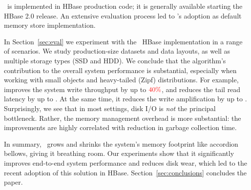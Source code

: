 \sys\ is implemented in HBase production code; it is generally available starting the HBase 2.0 release. 
An extensive evaluation process led to \sys's adoption as default memory store implementation. 

In Section~\ref{sec:eval} we experiment with the \sys\ HBase implementation in a range of scenarios.
We study production-size datasets and data layouts, as well as multiple storage types (SSD and HDD). 
We conclude that the algorithm's contribution to the overall system performance is substantial, 
especially when working with small objects and heavy-tailed (Zipf) distributions. For example, \sys\/ 
improves the system write throughput by up to ${\color{red}{40\%}}$, and reduces the tail read latency by up to 
. At the same time, it reduces the write amplification by up to . Surprisingly, we see 
that in most settings, disk I/O is \emph{not} the principal bottleneck. Rather, the memory management 
overhead is more substantial: the improvements are highly correlated with  reduction in garbage collection time. 

In summary, \sys\ grows and shrinks the system's memory footprint like accordion bellows, giving it breathing 
room. Our experiments show that it significantly improves end-to-end system performance and reduces disk wear, 
which led to the recent adoption of this solution in HBase. Section~\ref{sec:conclusions} concludes the paper.

